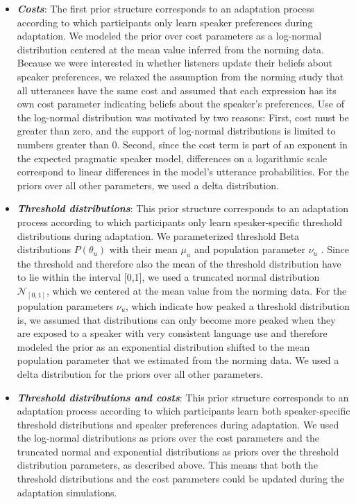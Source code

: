\documentclass[lucida,biblatex]{sp} %
\begin{document}
\begin{itemize}
\item \textbf{\textit{Costs}}: The first prior structure corresponds to an adaptation process according to which participants only learn speaker preferences during adaptation. 
We modeled the prior over cost parameters  as a log-normal distribution centered at the mean value inferred from the norming data. Because we were interested in whether listeners update their beliefs about speaker preferences, we relaxed the assumption from the norming study that all utterances have the same cost and assumed that each expression has its own cost parameter indicating beliefs about the speaker's preferences. Use of the log-normal distribution was motivated by two reasons: First, cost must be greater than zero, and the support of log-normal distributions is limited to numbers greater than 0. Second, since the cost term is part of an exponent in the expected pragmatic speaker model, differences on a logarithmic scale correspond to linear differences in the model's utterance probabilities. For the priors over all other parameters, we used a delta distribution.
\item \textbf{\textit{Threshold distributions}}:  This prior structure corresponds to an adaptation process according to which participants only learn speaker-specific threshold distributions during adaptation. We parameterized threshold Beta distributions $P(\theta_u)$ with their mean $\mu_u$ and population parameter $\nu_u$ \citep{Kruschke2014}. Since the threshold and therefore also the mean of the threshold distribution have to lie within the interval [0,1], we used a truncated normal distribution $\mathscr{N}_{[0,1]}$, which we centered at the mean value from the norming data. For the population parameters $\nu_u$, which indicate how peaked a threshold distribution is, we assumed that distributions can only become more peaked when they are exposed to a speaker with very consistent language use and therefore modeled the prior as an exponential distribution shifted to the mean population parameter that we estimated from the norming data. We used a delta distribution for the priors over all other parameters.
\item  \textbf{\textit{Threshold distributions and costs}}:   This prior structure corresponds to an adaptation process according to which participants learn both speaker-specific threshold distributions and speaker preferences during adaptation.  We used the log-normal distributions as priors over the cost parameters and the truncated normal and exponential distributions as priors over the threshold distribution parameters, as described above. This means that both the threshold distributions and the cost parameters could be updated during the adaptation simulations.
\end{itemize}
\end{document}
